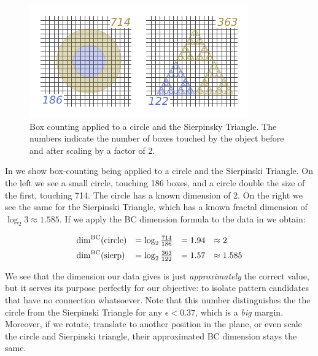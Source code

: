 \begin{figure}
  \includegraphics[width=\linewidth]{src/img/box-counting-example-alt.pdf}
  \caption{Box counting applied to a circle and the Sierpinsky Triangle. The numbers
indicate the number of boxes touched by the object before and after scaling by a factor of 2.}
  \label{fig:egboxcount}
\end{figure}


In  we show box-counting being applied to a
circle and the Sierpinski Triangle. On the left we see a small circle,
touching 186 boxes, and a circle double the size of the first,
touching 714.  The circle has a known dimension of 2. On the right we
see the same for the Sierpinski Triangle, which has a known fractal
dimension of $\log_2 3 \approx 1.585$.  If we apply the BC dimension
formula to the data in  we obtain:

\[
\begin{array}{l l l l}
  \mathrm{dim}^{\mathrm{BC}} (\mathrm{circle}) &= \log_2{\frac{714}{186}} &= 1.94 &\approx 2 \\[.5em]
  \mathrm{dim}^{\mathrm{BC}} (\mathrm{sierp})  &= \log_2{\frac{363}{122}} &= 1.57 &\approx 1.585 \\
\end{array}
\]

  We see that the dimension our data gives is just
\emph{approximately} the correct value, but it serves its purpose
perfectly for our objective: to isolate pattern candidates that have
no connection whatsoever. Note that this number distinguishes the
the circle from the Sierpinski Triangle for any $\epsilon < 0.37$,
which is a \emph{big} margin. Moreover, if we rotate, translate 
to another position in the plane, or even scale the circle and
Sierpinski triangle, their approximated BC dimension stays the same.


